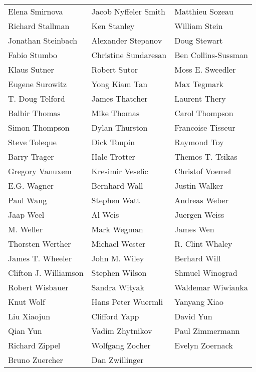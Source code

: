 \begin{tabular}{lll}
Elena Smirnova         & Jacob Nyffeler Smith   & Matthieu Sozeau\\
Richard Stallman       & Ken Stanley            & William Stein\\
Jonathan Steinbach     & Alexander Stepanov     & Doug Stewart\\
Fabio Stumbo           & Christine Sundaresan   & Ben Collins-Sussman\\
Klaus Sutner           & Robert Sutor           & Moss E. Sweedler\\
Eugene Surowitz        & Yong Kiam Tan          & Max Tegmark\\
T. Doug Telford        & James Thatcher         & Laurent Thery\\
Balbir Thomas          & Mike Thomas            & Carol Thompson\\
Simon Thompson         & Dylan Thurston         & Francoise Tisseur\\
Steve Toleque          & Dick Toupin            & Raymond Toy\\
Barry Trager           & Hale Trotter           & Themos T. Tsikas\\
Gregory Vanuxem        & Kresimir Veselic       & Christof Voemel\\
E.G. Wagner            & Bernhard Wall          & Justin Walker\\
Paul Wang              & Stephen Watt           & Andreas Weber\\
Jaap Weel              & Al Weis                & Juergen Weiss\\
M. Weller              & Mark Wegman            & James Wen\\
Thorsten Werther       & Michael Wester         & R. Clint Whaley\\
James T. Wheeler       & John M. Wiley          & Berhard Will\\
Clifton J. Williamson  & Stephen Wilson         & Shmuel Winograd\\
Robert Wisbauer        & Sandra Wityak          & Waldemar Wiwianka\\
Knut Wolf              & Hans Peter Wuermli     & Yanyang Xiao\\
Liu Xiaojun            & Clifford Yapp          & David Yun\\
Qian Yun               & Vadim Zhytnikov        & Paul Zimmermann\\
Richard Zippel         & Wolfgang Zocher        & Evelyn Zoernack\\
Bruno Zuercher         & Dan Zwillinger\\
\end{tabular}
\newpage

